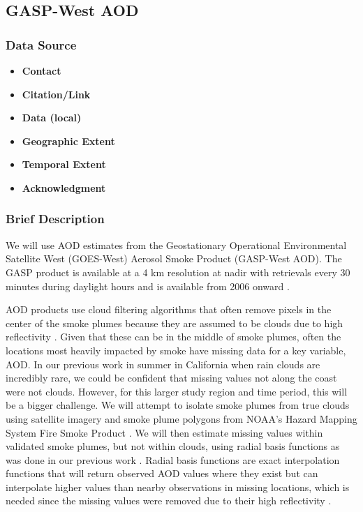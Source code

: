\subsection{GASP-West AOD}

\subsubsection*{Data Source}

\begin{itemize}[nolistsep]
\item \textbf{Contact}
\item \textbf{Citation/Link}
\item \textbf{Data (local)}
\item \textbf{Geographic Extent}
\item \textbf{Temporal Extent}
\item \textbf{Acknowledgment}
\end{itemize}

\subsubsection*{Brief Description}

We will use AOD estimates from the Geostationary Operational Environmental Satellite West (GOES-West) Aerosol Smoke Product (GASP-West AOD). The GASP product is available at a 4 km resolution at nadir with retrievals every 30 minutes during daylight hours and is available from 2006 onward 
\citep{GASPAerosolProduct2017}.  

AOD products use cloud filtering algorithms that often remove pixels in the center of the smoke plumes because they are assumed to be clouds due to high reflectivity \citep{kondragunta_revisions_2009}. Given that these can be in the middle of smoke plumes, often the locations most heavily impacted by smoke have missing data for a key variable, AOD. In our previous work in summer in California when rain clouds are incredibly rare, we could be confident that missing values not along the coast were not clouds. However, for this larger study region and time period, this will be a bigger challenge. We will attempt to isolate smoke plumes from true clouds using satellite imagery and smoke plume polygons from NOAA's Hazard Mapping System Fire Smoke Product  \citep{NOAAHazMap2017}. We will then estimate missing values within validated smoke plumes, but not within clouds, using radial basis functions as was done in our previous work \citep{Reid2015}. Radial basis functions are exact interpolation functions that will return observed AOD values where they exist but can interpolate higher values than nearby observations in missing locations, which is needed since the missing values were removed due to their high reflectivity \citep{Reid2015}.

